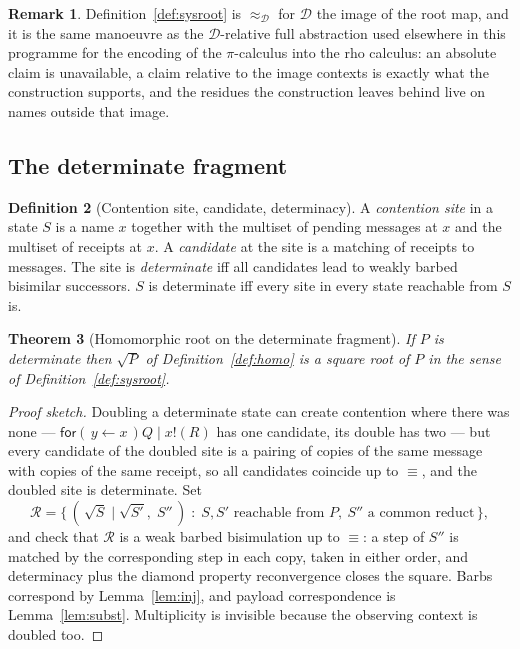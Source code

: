\documentclass[11pt]{article}
\newtheorem{theorem}{Theorem}[section]
\theoremstyle{definition}
\newtheorem{definition}[theorem]{Definition}
\newtheorem{remark}[theorem]{Remark}
\newcommand{\rhoc}{rho calculus}
\newcommand{\In}[2]{\mathsf{for}(\,#1 \leftarrow #2\,)}
\newcommand{\rt}[1]{\sqrt{#1}}
\begin{document}
\begin{remark}
Definition~\ref{def:sysroot} is $\approx_{\mathcal{D}}$ for $\mathcal{D}$ the image of the root map, and it is the same manoeuvre as the $\mathcal{D}$-relative full abstraction used elsewhere in this programme for the encoding of the $\pi$-calculus into the \rhoc{}: an absolute claim is unavailable, a claim relative to the image contexts is exactly what the construction supports, and the residues the construction leaves behind live on names outside that image.
\end{remark}

\subsection{The determinate fragment}

\begin{definition}[Contention site, candidate, determinacy]\label{def:site}
A \emph{contention site} in a state $S$ is a name $x$ together with the multiset of pending messages at $x$ and the multiset of receipts at $x$. A \emph{candidate} at the site is a matching of receipts to messages. The site is \emph{determinate} iff all candidates lead to weakly barbed bisimilar successors. $S$ is determinate iff every site in every state reachable from $S$ is.
\end{definition}

\begin{theorem}[Homomorphic root on the determinate fragment]\label{thm:det}
If $P$ is determinate then $\rt{P}$ of Definition~\ref{def:homo} is a square root of $P$ in the sense of Definition~\ref{def:sysroot}.
\end{theorem}

\begin{proof}[Proof sketch]
Doubling a determinate state can create contention where there was none --- $\In{y}{x}Q \mid x!(R)$ has one candidate, its double has two --- but every candidate of the doubled site is a pairing of copies of the same message with copies of the same receipt, so all candidates coincide up to $\equiv$, and the doubled site is determinate. Set
\[
  \mathcal{R} = \{\,(\,\rt{S} \mid \rt{S'},\; S''\,) \;:\; S, S' \text{ reachable from } P,\ S'' \text{ a common reduct}\,\},
\]
and check that $\mathcal{R}$ is a weak barbed bisimulation up to $\equiv$: a step of $S''$ is matched by the corresponding step in each copy, taken in either order, and determinacy plus the diamond property reconvergence closes the square. Barbs correspond by Lemma~\ref{lem:inj}, and payload correspondence is Lemma~\ref{lem:subst}. Multiplicity is invisible because the observing context is doubled too.
\end{proof}
\end{document}
